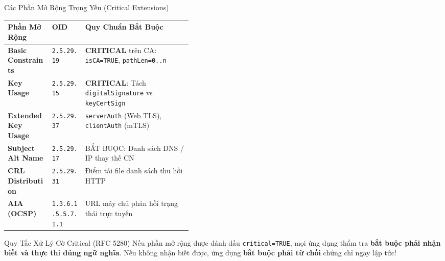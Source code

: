 \begin{frame}{Các Phần Mở Rộng Trọng Yếu (Critical Extensions)}
  \begin{table}[h]
    \centering\scriptsize
    \begin{tabularx}{\linewidth}{@{}p{0.24\linewidth} p{0.18\linewidth} X@{}}
      \toprule
      \textbf{Phần Mở Rộng} & \textbf{OID} & \textbf{Quy Chuẩn Bắt Buộc} \\
      \midrule
      \textbf{Basic Constraints} & \texttt{2.5.29.19} & \textbf{CRITICAL} trên CA: \texttt{isCA=TRUE}, \texttt{pathLen=0..n} \\
      \textbf{Key Usage} & \texttt{2.5.29.15} & \textbf{CRITICAL}: Tách \texttt{digitalSignature} vs \texttt{keyCertSign} \\
      \textbf{Extended Key Usage} & \texttt{2.5.29.37} & \texttt{serverAuth} (Web TLS), \texttt{clientAuth} (mTLS) \\
      \textbf{Subject Alt Name} & \texttt{2.5.29.17} & BẮT BUỘC: Danh sách DNS / IP thay thế CN \\
      \textbf{CRL Distribution} & \texttt{2.5.29.31} & Điểm tải file danh sách thu hồi HTTP \\
      \textbf{AIA (OCSP)} & \texttt{1.3.6.1.5.5.7.1.1} & URL máy chủ phản hồi trạng thái trực tuyến \\
      \bottomrule
    \end{tabularx}
  \end{table}

  \begin{alertblock}{Quy Tắc Xử Lý Cờ Critical (RFC 5280)}
    Nếu phần mở rộng được đánh dấu \texttt{critical=TRUE}, mọi ứng dụng thẩm tra \textbf{bắt buộc phải nhận biết và thực thi đúng ngữ nghĩa}. Nếu không nhận biết được, ứng dụng \textbf{bắt buộc phải từ chối} chứng chỉ ngay lập tức!
  \end{alertblock}
\end{frame}

